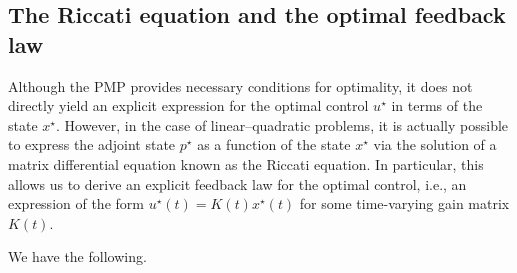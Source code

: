 \subsection{The Riccati equation and the optimal feedback law}

Although the PMP provides necessary conditions for optimality, it does not directly yield an explicit expression for the optimal control $u^\star$ in terms of the state $x^\star$.
However, in the case of linear–quadratic problems, it is actually possible to express the adjoint state $p^\star$ as a function of the state $x^\star$ via the solution of a matrix differential equation known as the Riccati equation. 
In particular, this allows us to derive an explicit feedback law for the optimal control, i.e., an expression of the form $u^\star(t) = K(t) x^\star(t)$ for some time-varying gain matrix $K(t)$.



We have the following.



